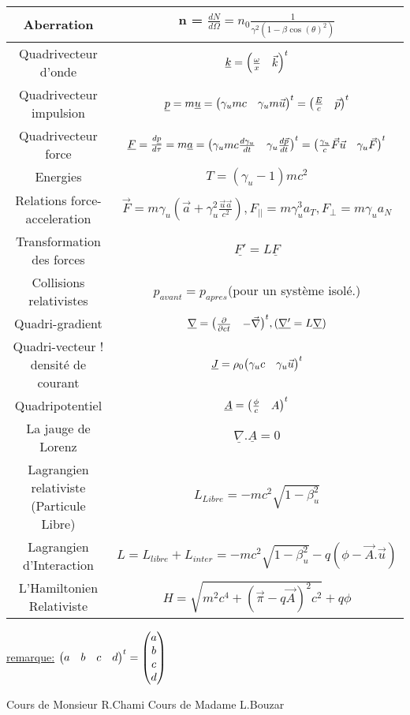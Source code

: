 \documentclass[french]{article}
\begin{document}
\begin{center}
\begin{tabular}{| c | c |}
\hline
Aberration&n = $\frac{dN}{d\Omega}= n_0\frac{1}{\gamma^2\left(1-\beta\cos(\theta)^2\right)}$\\
\hline
Quadrivecteur d’onde&$\underline{k}= \mqty(\frac{\omega}{x} &\vec{k})^t$\\
\hline
Quadrivecteur impulsion&$\underline{p}=m \underline{u}=\mqty(\gamma_u mc & \gamma_u m\vec{u})^t=\mqty(\frac{E}{c}&\vec{p})^t$\\
\hline
Quadrivecteur force&$\underline{F}=\frac{d\underline{p}}{d\tau}= m \underline{a}= \mqty(\gamma_umc\frac{d \gamma_u}{dt}&\gamma_u \frac{d\vec{p}}{dt})^t =\mqty(\frac{\gamma_u}{c}\vec{F}\vec{u}&\gamma_u\vec{F})^t$\\
\hline
Energies&$T = \left(\gamma_u-1\right)mc^2$\\
\hline
Relations force-acceleration&$\vec{F}=m\gamma_u\left(\vec{a}+\gamma_u^2\frac{\vec{u}\vec{a}}{c^2}\right), F_{||}=m\gamma_u^3a_T, F_{\perp}= m\gamma_ua_N$\\
\hline
Transformation des forces&$\underline{F'}= L\underline{F}$\\
\hline
Collisions relativistes&$p_{avant} = p_{apres}$(pour
un système isolé.)\\
\hline
Quadri-gradient&$\underline{\nabla}=\mqty(\pdv{ct}&-\vec{\nabla})^t, (\underline{\nabla'}=L\underline{\nabla})$\\
\hline
Quadri-vecteur ! densité de courant&$\underline{J}= \rho_0\mqty(\gamma_uc&\gamma_u\vec{u})^t$\\
\hline
Quadripotentiel&$\underline{A}=\mqty(\frac{\phi}{c}& A)^t$\\
\hline
La jauge de Lorenz&$\underline{\nabla}.\underline{A}=0$\\
\hline
Lagrangien relativiste (Particule Libre)&$L_{Libre}= -mc^2\sqrt{1-\beta_u^2}$\\
\hline
Lagrangien d’Interaction&$L = L_{libre}+L_{inter}=-mc^2\sqrt{1-\beta_u^2}-q\left(\phi-\vec{A}.\vec{u}\right)$\\
\hline
L’Hamiltonien Relativiste&$H = \sqrt{m^2c^4+\left(\vec{\pi}-q\vec{A}\right)^2c^2}+q\phi$
\\
\hline



		
			
			
			
		\end{tabular}
	\end{center}
\underline{remarque:} $\mqty(a&b&c&d)^t= \mqty(a\\b\\c\\d)$ 
\begin{thebibliography}{9}
	Cours de Monsieur R.Chami
	Cours de Madame L.Bouzar
\end{thebibliography}
\end{document}
